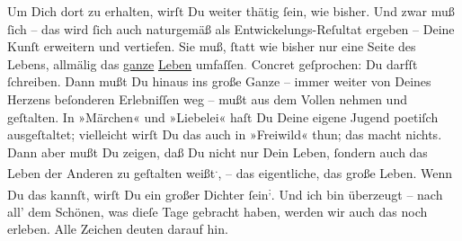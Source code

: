\pstart
           Um Dich dort zu erhalten, wirſt Du weiter thätig{ }ſein, wie bisher. Und zwar muß{ }ſich
               – das wird {\pb}ſich auch naturgemäß als
               Entwickelungs-Reſultat ergeben – Deine Kunſt erweitern und vertiefen. Sie muß,{ }ſtatt
               wie bisher nur eine Seite des Lebens, allmälig das \uline{ganze}{ }\uline{Leben} umfaſſen\textcolor{gray}{.} Concret  geſprochen: Du darfſt \label{K_L02753-2v}\label{K_L02753-2}{ }ſchreiben. Dann mußt Du hinaus ins große Ganze – immer weiter von Deines
               Herzens beſonderen Erlebniſſen weg – mußt aus dem Vollen {\pb}nehmen und geſtalten. In »Märchen« und »Liebelei«
               haſt Du Deine eigene Jugend poetiſch ausgeſtaltet; vielleicht wirſt Du das auch in
                  »Freiwild« thun; das macht nichts. Dann aber
               mußt Du zeigen, daß Du nicht nur Dein Leben,{ }ſondern auch das Leben  der Anderen zu geſtalten weißt\substVorne{}\textsuperscript{.}\substDazwischen{},\substHinten{} – das eigentliche, das große Leben. Wenn Du das kannſt, wirſt Du ein großer
               Dichter{ }ſein\substVorne{}\textsuperscript{;}\substDazwischen{}.\substHinten{} Und ich bin überzeugt –  nach all’ dem
               Schönen, was dieſe {\pb}Tage gebracht haben, werden wir
               auch das noch  erleben. Alle Zeichen deuten darauf
               hin.\pend
           
